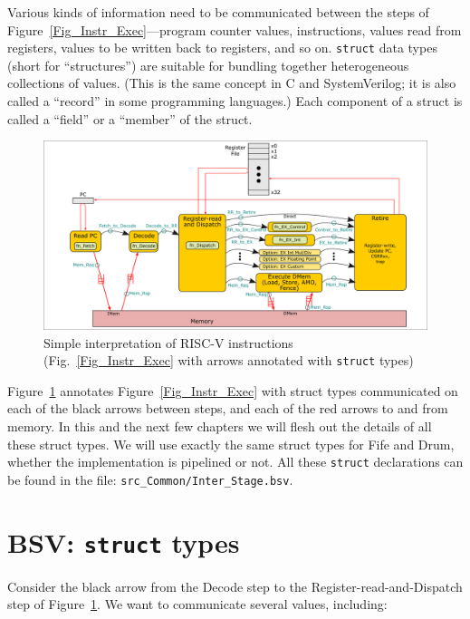 Various kinds of information need to be communicated between the steps
of Figure~\ref{Fig_Instr_Exec}---program counter values, instructions,
values read from registers, values to be written back to registers,
and so on.  \verb|struct| data types (short for ``structures'') are
suitable for bundling together heterogeneous collections of values.
(This is the same concept in C and SystemVerilog; it is also called a
``record'' in some programming languages.)  Each component of a struct
is called a ``field'' or a ``member'' of the struct.
\begin{figure}[htbp]
  \centerline{\includegraphics[width=6in,angle=0]{Figures/Fig_Instr_Exec_w_structs}}
  \caption{\label{Fig_Simple_Instr_Exec_w_structs}
           Simple interpretation of RISC-V instructions
	   (Fig.~\ref{Fig_Instr_Exec} with arrows annotated with {\tt struct} types)}
\end{figure}
Figure~\ref{Fig_Simple_Instr_Exec_w_structs} annotates
Figure~\ref{Fig_Instr_Exec} with struct types communicated on each of
the black arrows between steps, and each of the red arrows to and from
memory.  In this and the next few chapters we will flesh out the
details of all these struct types.  We will use exactly the same
struct types for Fife and Drum, {\ie} whether the implementation is
pipelined or not.  All these \verb|struct|
declarations can be found in the file: \verb|src_Common/Inter_Stage.bsv|.


\section{BSV: {\tt struct} types}

\label{BSV_struct_types}

Consider the black arrow from the Decode step to the
Register-read-and-Dispatch step of
Figure~\ref{Fig_Simple_Instr_Exec_w_structs}.
We want to communicate several values, including:

